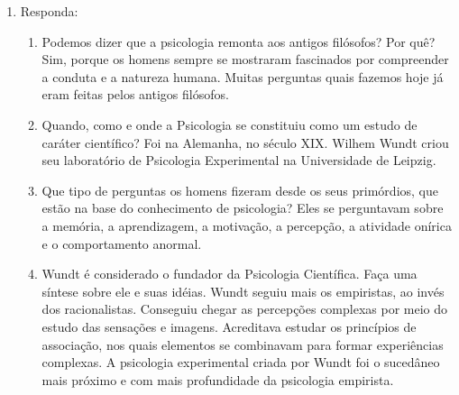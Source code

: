 \documentclass[a4paper, 12pt]{article}
\begin{document}
\begin{enumerate}
  
\item Responda: 
  \begin{enumerate}
  \item Podemos dizer que a psicologia remonta aos antigos filósofos? Por quê? \newline \newline
    Sim, porque os homens sempre se mostraram fascinados por compreender a conduta e a natureza humana. Muitas perguntas quais fazemos hoje já eram feitas pelos antigos filósofos. \newline
  \item Quando, como e onde a Psicologia se constituiu como um estudo de caráter científico? \newline \newline
  Foi na Alemanha, no século XIX. Wilhem Wundt criou seu laboratório de Psicologia Experimental na Universidade de Leipzig. \newline 
  \item Que tipo de perguntas os homens fizeram desde os seus primórdios, que estão na base do conhecimento de psicologia? \newline \newline
  Eles se perguntavam sobre a memória, a aprendizagem, a motivação, a percepção, a atividade onírica e o comportamento anormal. \newline
  \item Wundt é considerado o fundador da Psicologia Científica. Faça uma síntese sobre ele e suas idéias. \newline \newline
    Wundt seguiu mais os empiristas, ao invés dos racionalistas. Conseguiu chegar as percepções complexas por meio do estudo das sensações e imagens. Acreditava estudar os princípios de associação, nos quais elementos se combinavam para formar experiências complexas. A psicologia experimental criada por Wundt foi o sucedâneo mais próximo e com mais profundidade da psicologia empirista.
    \newline
  \end{enumerate}


\end{enumerate}
\end{document}
